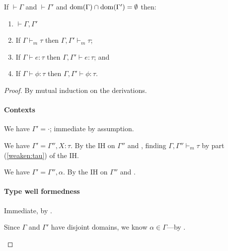 \documentclass[acmsmall,screen,nonacm]{acmart}
\theoremstyle{definition}
\begin{document}
\begin{lemma}[Weakening]
\label{lem:weakening}
  If $\vdash \Gamma$ and $\vdash \Gamma'$ and
  $\mathrm{dom}(\Gamma) \cap \mathrm{dom}(\Gamma') = \emptyset$ then:
%
\begin{enumerate}

\item \label{weaken:Gamma} $\vdash \Gamma,\Gamma'$

\item \label{weaken:tau} If $\Gamma \vdash_m \tau$ then $\Gamma,\Gamma' \vdash_m \tau$;

\item \label{weaken:e} If $\Gamma \vdash e : \tau$ then $\Gamma,\Gamma' \vdash e : \tau$; and

\item \label{weaken:phi} If $\Gamma \vdash \phi : \tau$ then $\Gamma,\Gamma' \vdash \phi : \tau$.

\end{enumerate}
%
\begin{proof}
  By mutual induction on the derivations.

\paragraph*{Contexts}
%
\begin{proofcases}

  \item[(\rn{$\Gamma$-Empty})] We have $\Gamma' = \cdot$; immediate by assumption.

  \item[(\rn{$\Gamma$-Var})] We have $\Gamma' = \Gamma'',X:\tau$. By
  the IH on $\Gamma''$ and , finding
  $\Gamma,\Gamma'' \vdash_m \tau$ by part (\ref{weaken:tau}) of
  the IH.

  \item[(\rn{$\Gamma$-TVar})] We have $\Gamma' = \Gamma'',\alpha$. By
  the IH on $\Gamma''$ and .

\end{proofcases}

\paragraph*{Type well formedness}
%
\begin{proofcases}

  \item[(\rn{$t$-Base})] Immediate, by .

  \item[(\rn{$t$-TVar})] Since $\Gamma$ and $\Gamma'$ have disjoint
  domains, we know $\alpha \in \Gamma$---by .


\end{proofcases}
\end{proof}
\end{lemma}
\end{document}
